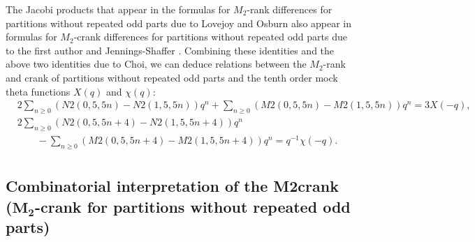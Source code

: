 \documentclass[10pt,a4paper]{amsart}
\numberwithin{equation}{section}
\begin{document}
The Jacobi products that appear in the formulas for $M_2$-rank differences for partitions without repeated odd parts due to Lovejoy and Osburn \cite[Theorem~1.2]{Lo-Os09} also appear in formulas for $M_2$-crank differences for partitions without repeated odd parts due to the first author and Jennings-Shaffer \cite[Theorem 2.12]{Ga-Sh}. Combining these identities and the above two identities due to Choi, we can deduce relations between the $M_2$-rank and crank of partitions without repeated odd parts and the tenth order mock theta functions $X(q)$ and $\chi(q)$:
\begin{align*}
&{}2\sum_{n\geq 0}(N2(0,5,5n)-N2(1,5,5n))q^n+\sum_{n\geq 0}(M2(0,5,5n)-M2(1,5,5n))q^n=3X(-q),
\\
&{}2\sum_{n\geq 0}(N2(0,5,5n+4)-N2(1,5,5n+4))q^n
\\
&\qquad{}-\sum_{n\geq 0}(M2(0,5,5n+4)-M2(1,5,5n+4))q^n=q^{-1}\chi(-q).\\
\end{align*}


\subsection[Combinatorial interpretation of the M2crank (M\_2-crank for partitions without repeated odd parts)]{Combinatorial interpretation of the M2crank \\($\boldsymbol{M_2}$-crank for partitions without repeated odd parts)}
\end{document}

